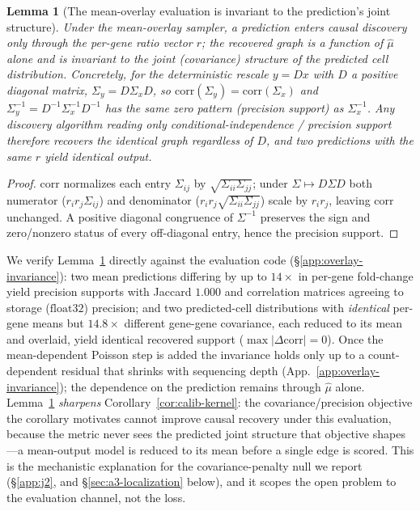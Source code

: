 \documentclass{article}
\theoremstyle{plain}
\newtheorem{lemma}[theorem]{Lemma}
\theoremstyle{definition}
\theoremstyle{remark}
\begin{document}
\begin{lemma}[The mean-overlay evaluation is invariant to the prediction's joint structure]
\label{lem:overlay-invariance}
Under the mean-overlay sampler, a prediction enters causal discovery only through the per-gene ratio vector $r$; the recovered graph is a function of $\hat\mu$ alone and is invariant to the joint (covariance) structure of the predicted cell distribution. Concretely, for the deterministic rescale $y=Dx$ with $D$ a positive diagonal matrix, $\Sigma_y = D\Sigma_x D$, so $\mathrm{corr}(\Sigma_y)=\mathrm{corr}(\Sigma_x)$ and $\Sigma_y^{-1}=D^{-1}\Sigma_x^{-1}D^{-1}$ has the same zero pattern (precision support) as $\Sigma_x^{-1}$. Any discovery algorithm reading only conditional-independence / precision support therefore recovers the identical graph regardless of $D$, and two predictions with the same $r$ yield identical output.
\end{lemma}

\begin{proof}
$\mathrm{corr}$ normalizes each entry $\Sigma_{ij}$ by $\sqrt{\Sigma_{ii}\Sigma_{jj}}$; under $\Sigma\mapsto D\Sigma D$ both numerator ($r_ir_j\Sigma_{ij}$) and denominator ($r_ir_j\sqrt{\Sigma_{ii}\Sigma_{jj}}$) scale by $r_ir_j$, leaving $\mathrm{corr}$ unchanged. A positive diagonal congruence of $\Sigma^{-1}$ preserves the sign and zero/nonzero status of every off-diagonal entry, hence the precision support. \end{proof}

We verify Lemma~\ref{lem:overlay-invariance} directly against the evaluation code (\S\ref{app:overlay-invariance}): two mean predictions differing by up to $14\times$ in per-gene fold-change yield precision supports with Jaccard $1.000$ and correlation matrices agreeing to storage ($\mathrm{float}32$) precision; and two predicted-cell distributions with \emph{identical} per-gene means but $14.8\times$ different gene-gene covariance, each reduced to its mean and overlaid, yield identical recovered support ($\max|\Delta\mathrm{corr}|=0$). Once the mean-dependent Poisson step is added the invariance holds only up to a count-dependent residual that shrinks with sequencing depth (App.~\ref{app:overlay-invariance}); the dependence on the prediction remains through $\hat\mu$ alone. Lemma~\ref{lem:overlay-invariance} \emph{sharpens} Corollary~\ref{cor:calib-kernel}: the covariance/precision objective the corollary motivates cannot improve causal recovery under this evaluation, because the metric never sees the predicted joint structure that objective shapes---a mean-output model is reduced to its mean before a single edge is scored. This is the mechanistic explanation for the covariance-penalty null we report (\S\ref{app:j2}, and \S\ref{sec:a3-localization} below), and it scopes the open problem to the evaluation channel, not the loss.
\end{document}
